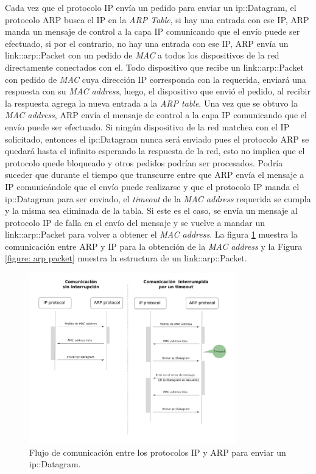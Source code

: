 \documentclass[10pt,a4paper]{article}
\begin{document}
Cada vez que el protocolo IP envía un pedido para enviar un ip::Datagram, el protocolo ARP busca el IP en la \textit{ARP Table}, si hay una entrada con ese IP, ARP manda un mensaje de control a la capa IP comunicando que el envío puede ser efectuado, si por el contrario, no hay una entrada con ese IP, ARP envía un link::arp::Packet con un pedido de \textit{MAC} a todos los dispositivos de la red directamente conectados con el. Todo dispositivo que recibe un link::arp::Packet con pedido de \textit{MAC} cuya dirección IP corresponda con la requerida, enviará una respuesta con su \textit{MAC address}, luego, el dispositivo que envió el pedido, al recibir la respuesta agrega la nueva entrada a la \textit{ARP table}. Una vez que se obtuvo la \textit{MAC address}, ARP envía el mensaje de control a la capa IP comunicando que el envío puede ser efectuado. Si ningún dispositivo de la red matchea con el IP solicitado, entonces el ip::Datagram nunca será enviado pues el protocolo ARP se quedará hasta el infinito esperando la respuesta de la red, esto no implica que el protocolo quede bloqueado y otros pedidos podrían ser procesados. Podría suceder que durante el tiempo que transcurre entre que ARP envía el mensaje a IP comunicándole que el envío puede realizarse y que el protocolo IP manda el ip::Datagram para ser enviado, el \textit{timeout} de la \textit{MAC address} requerida se cumpla y la misma sea eliminada de la tabla. Si este es el caso, se envía un mensaje al protocolo IP de falla en el envío del mensaje y se vuelve a mandar un link::arp::Packet para volver a obtener el \textit{MAC address}. La figura \ref{figure: ARP IP comunication flow} muestra la comunicación entre ARP y IP para la obtención de la \textit{MAC address} y la Figura \ref{figure: arp packet} muestra la estructura de un link::arp::Packet.\\

\begin{figure}[!htb]
    \centering
    \includegraphics[width = 0.8\textwidth]{img/png/ip-arp-comunication.png}
    \caption{Flujo de comunicación entre los protocolos IP y ARP para enviar un ip::Datagram.}
    \label{figure: ARP IP comunication flow}
\end{figure}
\end{document}
